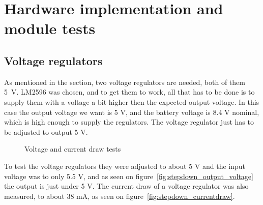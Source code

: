 \section{Hardware implementation and module tests}
\subsection{Voltage regulators}
As mentioned in the  section, two voltage regulators are needed, both of them 5~V.
LM2596 was chosen, and to get them to work, all that has to be done is to supply them with a voltage a bit higher then the expected output voltage. In this case the output voltage we want is 5 V, and the battery voltage is 8.4 V nominal, which is high enough to supply the regulators. The voltage regulator just has to be adjusted to output 5 V. 

\begin{figure}[H]
	\centering
	\hfill
	\hfill
	\caption{Voltage and current draw tests}
\end{figure}

To test the voltage regulators they were adjusted to about 5 V and the input voltage was to only 5.5 V, and as seen on figure~\ref{fig:stepdown_output_voltage} the output is just under 5 V.  The current draw of a voltage regulator was also measured, to about 38 mA, as seen on figure~\ref{fig:stepdown_currentdraw}.

